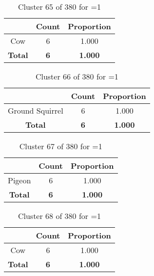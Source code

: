 \begin{table}[ht!]
\centering
\begin{tabular}{|c|c|c|}
\hline
\bf \Spec{} &\bf Count &\bf Proportion\\ \hline \hline
Cow & 6 & 1.000\\ \hline
\hline
\bf Total & \bf 6 & \bf 1.000\\ \hline
\end{tabular}
\label{tab:cluster:65:1}
\caption{Cluster 65 of 380 for \minneigh{}=1}
\end{table}

\begin{table}[ht!]
\centering
\begin{tabular}{|c|c|c|}
\hline
\bf \Spec{} &\bf Count &\bf Proportion\\ \hline \hline
Ground Squirrel & 6 & 1.000\\ \hline
\hline
\bf Total & \bf 6 & \bf 1.000\\ \hline
\end{tabular}
\label{tab:cluster:66:1}
\caption{Cluster 66 of 380 for \minneigh{}=1}
\end{table}

\begin{table}[ht!]
\centering
\begin{tabular}{|c|c|c|}
\hline
\bf \Spec{} &\bf Count &\bf Proportion\\ \hline \hline
Pigeon & 6 & 1.000\\ \hline
\hline
\bf Total & \bf 6 & \bf 1.000\\ \hline
\end{tabular}
\label{tab:cluster:67:1}
\caption{Cluster 67 of 380 for \minneigh{}=1}
\end{table}

\begin{table}[ht!]
\centering
\begin{tabular}{|c|c|c|}
\hline
\bf \Spec{} &\bf Count &\bf Proportion\\ \hline \hline
Cow & 6 & 1.000\\ \hline
\hline
\bf Total & \bf 6 & \bf 1.000\\ \hline
\end{tabular}
\label{tab:cluster:68:1}
\caption{Cluster 68 of 380 for \minneigh{}=1}
\end{table}

